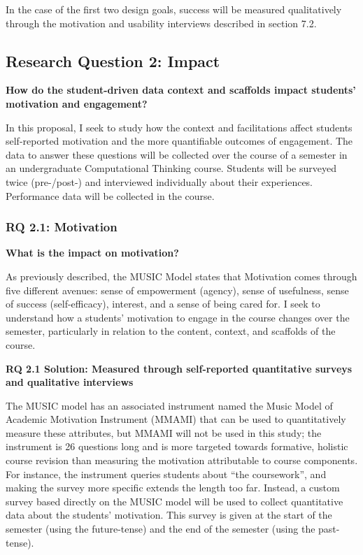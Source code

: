     In the case of the first two design goals, success will be measured qualitatively through the motivation and usability interviews described in section 7.2.
        
\subsection{Research Question 2: Impact}

\textbf{How do the student-driven data context and scaffolds impact students' motivation and engagement?}

	In this proposal, I seek to study how the context and facilitations affect students self-reported motivation and the more quantifiable outcomes of engagement.
    The data to answer these questions will be collected over the course of a semester in an undergraduate Computational Thinking course. Students will be surveyed twice (pre-/post-) and interviewed individually about their experiences. Performance data will be collected in the course.
    
    \subsubsection{RQ 2.1: Motivation}
    
    \textbf{What is the impact on motivation?}
    
    As previously described, the MUSIC Model states that Motivation comes through five different avenues: sense of empowerment (agency), sense of usefulness, sense of success (self-efficacy), interest, and a sense of being cared for.
    I seek to understand how a students' motivation to engage in the course changes over the semester, particularly in relation to the content, context, and scaffolds of the course. 
    
    \textbf{RQ 2.1 Solution: Measured through self-reported quantitative surveys and qualitative interviews}
        
    The MUSIC model has an associated instrument named the Music Model of Academic Motivation Instrument (MMAMI) that can be used to quantitatively measure these attributes, but MMAMI will not be used in this study; the instrument is 26 questions long and is more targeted towards formative, holistic course revision than measuring the motivation attributable to course components.
    For instance, the instrument queries students about ``the coursework'', and making the survey more specific extends the length too far.
    Instead, a custom survey based directly on the MUSIC model will be used to collect quantitative data about the students' motivation.
    This survey is given at the start of the semester (using the future-tense) and the end of the semester (using the past-tense).
    
